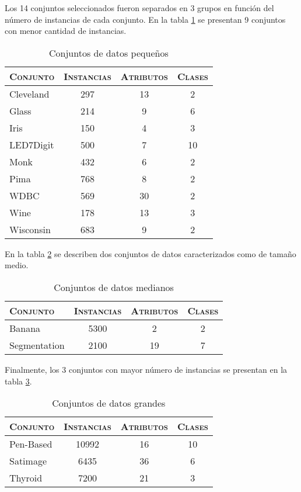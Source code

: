 Los 14 conjuntos seleccionados fueron separados en 3 grupos en función del número de instancias de cada conjunto. En la tabla \ref{data-small} se presentan 9 conjuntos con menor cantidad de instancias.

\begin{table}[h!]
\centering
\begin{tabular}{l c c c}
\hline
\textsc{Conjunto} & \textsc{Instancias} & \textsc{Atributos} & \textsc{Clases} \\
\hline
\hline
Cleveland & 297 & 13 &  2 \\
Glass     & 214 &  9 &  6 \\
Iris      & 150 &  4 &  3 \\
LED7Digit & 500 &  7 & 10 \\
Monk      & 432 &  6 &  2 \\
Pima      & 768 &  8 &  2 \\
WDBC      & 569 & 30 &  2 \\
Wine      & 178 & 13 &  3 \\
Wisconsin & 683 &  9 &  2 \\
\hline
\end{tabular}
\caption{Conjuntos de datos pequeños}
\label{data-small}
\end{table}

En la tabla \ref{data-med} se describen dos conjuntos de datos caracterizados como de tamaño medio.

\begin{table}[h!]
\centering
\begin{tabular}{l c c c}
\hline
\textsc{Conjunto} & \textsc{Instancias} & \textsc{Atributos} & \textsc{Clases} \\
\hline
\hline
Banana       &  5300 &  2 &  2 \\
Segmentation &  2100 & 19 &  7 \\
\hline
\end{tabular}
\caption{Conjuntos de datos medianos}
\label{data-med}
\end{table}

Finalmente, los 3 conjuntos con mayor número de instancias se presentan en la tabla \ref{data-big}.

\begin{table}[h!]
\centering
\begin{tabular}{l c c c}
\hline
\textsc{Conjunto} & \textsc{Instancias} & \textsc{Atributos} & \textsc{Clases} \\
\hline
\hline
Pen-Based    & 10992 & 16 & 10 \\
Satimage     &  6435 & 36 &  6 \\
Thyroid      &  7200 & 21 &  3 \\
\hline
\end{tabular}
\caption{Conjuntos de datos grandes}
\label{data-big}
\end{table}

